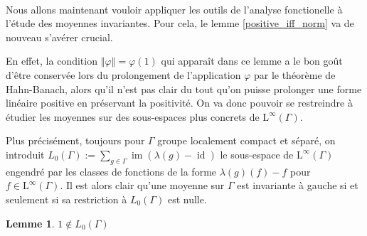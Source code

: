 \documentclass[a4paper,12pt]{article}
\newtheorem{lemma}[theorem]{Lemme}
\newcommand{\norm}[1]{\left\Vert #1\right\Vert}
\newcommand{\ssi}{si et seulement si }
\DeclareMathOperator{\id}{id}
\DeclareMathOperator{\Ima}{im}
\begin{document}
\paragraph{}
Nous allons maintenant vouloir appliquer les outils de l'analyse fonctionelle à l'étude des moyennes invariantes.
Pour cela, le lemme \ref{positive_iff_norm} va de nouveau s'avérer crucial.

En effet, la condition $\norm\varphi = \varphi(1)$ qui apparaît dans ce lemme a le bon goût d'être conservée lors du prolongement de l'application 
$\varphi$ par le théorème de Hahn-Banach, alors qu'il n'est pas clair du tout qu'on puisse prolonger une forme linéaire positive en préservant 
la positivité. On va donc pouvoir se restreindre à étudier les moyennes sur des sous-espaces plus concrets de $\mathrm{L}^\infty(\Gamma)$.

Plus précisément, toujours pour $\Gamma$ groupe localement compact et séparé, on introduit $L_0(\Gamma) := \sum_{g\in\Gamma} \Ima(\lambda(g) - \id)$ le sous-espace de 
$\mathrm{L}^\infty(\Gamma)$ engendré par les classes de fonctions de la forme $\lambda(g)(f) - f$ pour $f\in \mathrm{L}^\infty(\Gamma)$. 
Il est alors clair qu'une moyenne sur $\Gamma$ est invariante à gauche \ssi sa restriction à $L_0(\Gamma)$ est nulle. 

\begin{lemma}\label{one_not_mem_L0}
    $1\notin L_0(\Gamma)$
\end{lemma}
\end{document}
